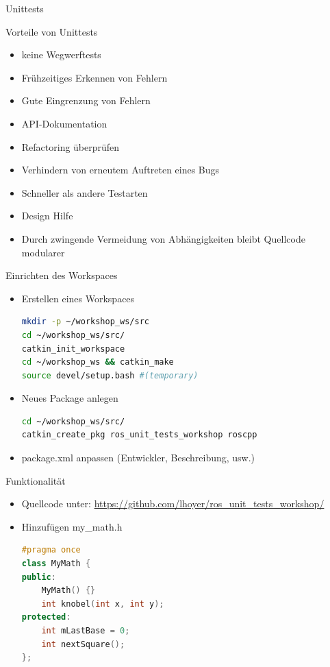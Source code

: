\documentclass{beamer}
\begin{document}
\begin{frame}{Unittests}
	\begin{block}{Vorteile von Unittests}
	\begin{itemize}
		\pause
		\item keine Wegwerftests
		\item Frühzeitiges Erkennen von Fehlern
		\item Gute Eingrenzung von Fehlern
		\item API-Dokumentation
		\item Refactoring überprüfen
		\item Verhindern von erneutem Auftreten eines Bugs
		\item Schneller als andere Testarten
		\item Design Hilfe
		\item Durch zwingende Vermeidung von Abhängigkeiten bleibt Quellcode modularer
	\end{itemize}
	\end{block}
\end{frame}

\begin{frame}[fragile]{Einrichten des Workspaces}
\begin{itemize}
\item Erstellen eines Workspaces
\begin{lstlisting}[language=bash]
mkdir -p ~/workshop_ws/src
cd ~/workshop_ws/src/
catkin_init_workspace
cd ~/workshop_ws && catkin_make
source devel/setup.bash #(temporary)
\end{lstlisting}
\pause
\item Neues Package anlegen
\begin{lstlisting}[language=bash]
cd ~/workshop_ws/src/
catkin_create_pkg ros_unit_tests_workshop roscpp
\end{lstlisting}
\item package.xml anpassen (Entwickler, Beschreibung, usw.)
\end{itemize}
\end{frame}

\begin{frame}[fragile]{Funktionalität}
\begin{itemize}
\item Quellcode unter: \url{https://github.com/lhoyer/ros_unit_tests_workshop/}
\item Hinzufügen my\_math.h
\begin{lstlisting}[language=c++]
#pragma once
class MyMath {
public:
	MyMath() {}
	int knobel(int x, int y);
protected:
	int mLastBase = 0;
	int nextSquare();
};
\end{lstlisting}
\end{itemize}
\end{frame}
\end{document}
